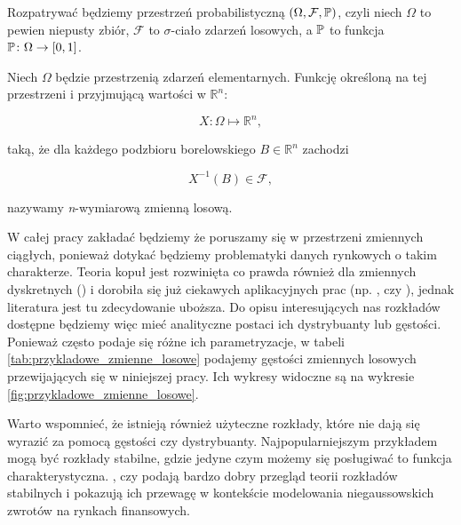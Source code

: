 Rozpatrywać będziemy przestrzeń probabilistyczną $(\Omega,\mathcal{F},\mathbb{P})$, czyli niech $\Omega$ to pewien niepusty zbiór, $\mathcal{F}$ to $\sigma$-ciało zdarzeń losowych, a $\mathbb{P}$ to funkcja $\mathbb{P}\colon\Omega\rightarrow[0,1]$. 

\begin{df}
	\label{df:n_wym_zmienna_losowa}
	Niech $\Omega$ będzie przestrzenią zdarzeń elementarnych. Funkcję określoną na tej przestrzeni i przyjmującą wartości w $\mathbb{R}^{n}$:
	
	$$ X\colon \Omega \mapsto \mathbb{R}^{n}, $$

	taką, że dla każdego podzbioru borelowskiego $B\in\mathbb{R}^n$ zachodzi
	
	$$ X^{-1}(B) \in \mathcal{F},$$
	
	nazywamy \textit{n}-wymiarową zmienną losową.
\end{df}

W całej pracy zakładać będziemy że poruszamy się w przestrzeni zmiennych ciągłych, ponieważ dotykać będziemy problematyki danych rynkowych o takim charakterze. Teoria kopuł jest rozwinięta co prawda również dla zmiennych dyskretnych (\cite{Genest_Discrete_Copulas}) i dorobiła się już ciekawych aplikacyjnych prac (np. \cite{Koopman_DiscreteCopula_HTF}, czy \cite{Shefzik_Weather}), jednak literatura jest tu zdecydowanie uboższa. Do opisu interesujących nas rozkładów dostępne będziemy więc mieć analityczne postaci ich dystrybuanty lub gęstości. Ponieważ często podaje się różne ich parametryzacje, w tabeli \ref{tab:przykladowe_zmienne_losowe} podajemy gęstości zmiennych losowych przewijających się w niniejszej pracy. Ich wykresy widoczne są na wykresie \ref{fig:przykladowe_zmienne_losowe}.

Warto wspomnieć, że istnieją również użyteczne rozkłady, które nie dają się wyrazić za pomocą gęstości czy dystrybuanty. Najpopularniejszym przykładem mogą być rozkłady stabilne, gdzie jedyne czym możemy się posługiwać to funkcja charakterystyczna.  \cite{Stable_Distributions1}, czy \cite{Stable_Distributions2} podają bardzo dobry przegląd teorii rozkładów stabilnych i pokazują ich przewagę w kontekście modelowania niegaussowskich zwrotów na rynkach finansowych.

